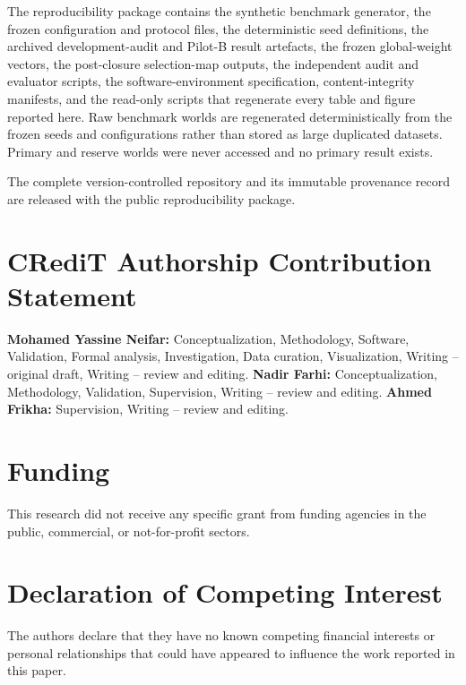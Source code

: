 \documentclass[runningheads,orivec]{llncs}
\newif\ifanon
\begin{document}
The reproducibility package contains the synthetic benchmark generator, the frozen
configuration and protocol files, the deterministic seed definitions, the archived
development-audit and Pilot-B result artefacts, the frozen global-weight vectors, the
post-closure selection-map outputs, the independent audit and evaluator scripts, the
software-environment specification, content-integrity manifests, and the read-only
scripts that regenerate every table and figure reported here. Raw benchmark worlds are
regenerated deterministically from the frozen seeds and configurations rather than
stored as large duplicated datasets. Primary and reserve worlds were never accessed and
no primary result exists.
\ifanon
During double-blind review, identifying repository metadata is withheld; an anonymous
archive can be supplied to editors and reviewers on request. The complete
version-controlled repository and its immutable provenance record will be released
publicly after review.
\else
The complete version-controlled repository and its immutable provenance record are
released with the public reproducibility package.
\fi

\ifanon
\else
\section*{CRediT Authorship Contribution Statement}

\textbf{Mohamed Yassine Neifar:} Conceptualization, Methodology, Software, Validation,
Formal analysis, Investigation, Data curation, Visualization, Writing -- original
draft, Writing -- review and editing.
\textbf{Nadir Farhi:} Conceptualization, Methodology, Validation, Supervision,
Writing -- review and editing.
\textbf{Ahmed Frikha:} Supervision, Writing -- review and editing.
\fi

\section*{Funding}

This research did not receive any specific grant from funding agencies in the public,
commercial, or not-for-profit sectors.

\section*{Declaration of Competing Interest}

The authors declare that they have no known competing financial interests or personal
relationships that could have appeared to influence the work reported in this paper.
\end{document}
